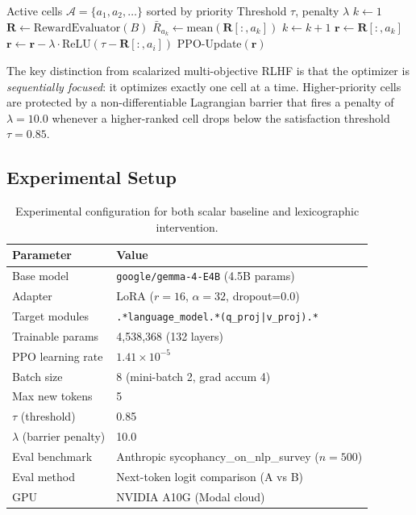 \documentclass[11pt,a4paper]{article}
\begin{document}
\begin{algorithm}
\caption{Sequential Constrained PPO with Lagrangian Barrier}
\label{alg:lex_ppo}
\begin{algorithmic}[1]
\Require Active cells $\mathcal{A} = \{a_1, a_2, \ldots\}$ sorted by priority
\Require Threshold $\tau$, penalty $\lambda$
\State $k \gets 1$ 
    \State $\mathbf{R} \gets \text{RewardEvaluator}(B)$ 
    \State $\bar{R}_{a_k} \gets \text{mean}(\mathbf{R}[:, a_k])$
     
        \State $k \gets k + 1$
    \EndIf
    \State $\mathbf{r} \gets \mathbf{R}[:, a_k]$ 
     
        \State $\mathbf{r} \gets \mathbf{r} - \lambda \cdot \text{ReLU}(\tau - \mathbf{R}[:, a_i])$
    \EndFor
    \State PPO-Update$(\mathbf{r})$
\EndFor
\end{algorithmic}
\end{algorithm}

The key distinction from scalarized multi-objective RLHF is that the optimizer is \emph{sequentially focused}: it optimizes exactly one cell at a time. Higher-priority cells are protected by a non-differentiable Lagrangian barrier that fires a penalty of $\lambda = 10.0$ whenever a higher-ranked cell drops below the satisfaction threshold $\tau = 0.85$.

\subsection{Experimental Setup}

\begin{table}[h]
\centering
\begin{tabular}{ll}
\toprule
\textbf{Parameter} & \textbf{Value} \\
\midrule
Base model & \texttt{google/gemma-4-E4B} (4.5B params) \\
Adapter & LoRA ($r=16$, $\alpha=32$, dropout=0.0) \\
Target modules & \texttt{.*language\_model.*(q\_proj|v\_proj).*} \\
Trainable params & 4,538,368 (132 layers) \\
PPO learning rate & $1.41 \times 10^{-5}$ \\
Batch size & 8 (mini-batch 2, grad accum 4) \\
Max new tokens & 5 \\
$\tau$ (threshold) & 0.85 \\
$\lambda$ (barrier penalty) & 10.0 \\
Eval benchmark & Anthropic sycophancy\_on\_nlp\_survey ($n=500$) \\
Eval method & Next-token logit comparison (A vs B) \\
GPU & NVIDIA A10G (Modal cloud) \\
\bottomrule
\end{tabular}
\caption{Experimental configuration for both scalar baseline and lexicographic intervention.}
\label{tab:config}
\end{table}
\end{document}
